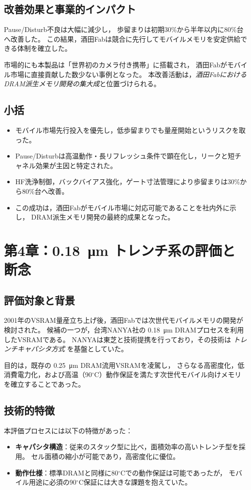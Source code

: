 \documentclass[conference]{IEEEtran}
\let\meter\metre
\begin{document}
\subsection{改善効果と事業的インパクト}
Pause/Disturb不良は大幅に減少し，
歩留まりは初期30\%から半年以内に80\%台へ改善した。
この結果，酒田Fabは競合に先行してモバイルメモリを安定供給できる体制を確立した。  

市場的にも本製品は「世界初のカメラ付き携帯」に搭載され，
酒田Fabがモバイル市場に直接貢献した数少ない事例となった。
本改善活動は，\emph{酒田FabにおけるDRAM派生メモリ開発の集大成}と位置づけられる。

\subsection{小括}
\begin{itemize}
  \item モバイル市場先行投入を優先し，低歩留まりでも量産開始というリスクを取った。
  \item Pause/Disturbは高温動作・長リフレッシュ条件で顕在化し，リークと短チャネル効果が主因と特定された。
  \item HF洗浄制御，バックバイアス強化，ゲート寸法管理により歩留まりは30\%から80\%台へ改善。
  \item この成功は，酒田Fabがモバイル市場に対応可能であることを社内外に示し，
        DRAM派生メモリ開発の最終的成果となった。
\end{itemize}

\section{第4章：\texorpdfstring{\SI{0.18}{\micro\meter}}{0.18µm} トレンチ系の評価と断念}

\subsection{評価対象と背景}
2001年のVSRAM量産立ち上げ後，酒田Fabでは次世代モバイルメモリの開発が検討された。  
候補の一つが，台湾NANYA社の \SI{0.18}{\micro\meter} DRAMプロセスを利用したVSRAMである。  
NANYAは東芝と技術提携を行っており，その技術は \emph{トレンチキャパシタ方式} を基盤としていた。  

目的は，既存の \SI{0.25}{\micro\meter} DRAM流用VSRAMを凌駕し，  
さらなる高密度化，低消費電力化，および高温（90$^\circ$C）動作保証を満たす次世代モバイル向けメモリを確立することであった。

\subsection{技術的特徴}
本評価プロセスには以下の特徴があった：
\begin{itemize}
  \item \textbf{キャパシタ構造}：従来のスタック型に比べ，面積効率の高いトレンチ型を採用。  
        セル面積の縮小が可能であり，高密度化に優位。
  \item \textbf{動作仕様}：標準DRAMと同様に80$^\circ$Cでの動作保証は可能であったが，  
        モバイル用途に必須の90$^\circ$C保証には大きな課題を抱えていた。
\end{itemize}
\end{document}
